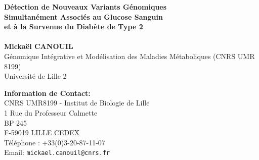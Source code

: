 \documentclass[a0,portrait]{a0poster}
\begin{document}
\Large




\begin{minipage}[t]{0.60\linewidth}
\vspace{2cm}
\Huge \color{ku} \textbf{Détection de Nouveaux Variants Génomiques \\Simultanément Associés au Glucose Sanguin \\et à la Survenue du Diabète de Type 2} \color{Black}\\ %
\\ %
\Large \textbf{Mickaël CANOUIL}\\[0.5cm] %
\Large Génomique Intégrative et Modélisation des Maladies Métaboliques (CNRS UMR 8199)\\ %
\Large Université de Lille 2\\[0.4cm] %
\end{minipage}
%
\begin{minipage}[t]{0.40\linewidth}
\vspace{2cm}
\flushright
\color{DarkSlateGray}
\Large \textbf{Information de Contact:}\\
CNRS UMR8199 - Institut de Biologie de Lille\\
1 Rue du Professeur Calmette\\
BP 245\\
F-59019 LILLE CEDEX\\[1cm]
Téléphone : +33(0)3-20-87-11-07\\ %
Email: \texttt{mickael.canouil@cnrs.fr}%
\end{minipage}

\vspace{1cm} %

\end{document}
